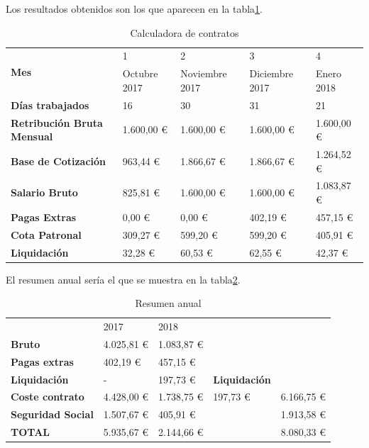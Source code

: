 Los resultados obtenidos son los que aparecen en la tabla\ref{fig:calc_cont}.


\begin{table}[htpb]
\centering
\begin{tabularx}{\textwidth}{|X|X|X|X|X|}
\hline
\multirow{2}{*}{\textbf{Mes}}      & 1            & 2              & 3              & 4          \\ \cline{2-5} 
                                   & Octubre 2017 & Noviembre 2017 & Diciembre 2017 & Enero 2018 \\ \hline
\textbf{Días trabajados}           & 16           & 30             & 31             & 21         \\ \hline
\textbf{Retribución Bruta Mensual} & 1.600,00 €   & 1.600,00 €     & 1.600,00 €     & 1.600,00 € \\ \hline
\textbf{Base de Cotización}        & 963,44 €     & 1.866,67 €     & 1.866,67 €     & 1.264,52 € \\ \hline
\textbf{Salario Bruto}             & 825,81 €     & 1.600,00 €     & 1.600,00 €     & 1.083,87 € \\ \hline
\textbf{Pagas Extras}              & 0,00 €       & 0,00 €         & 402,19 €       & 457,15 €   \\ \hline
\textbf{Cota Patronal}             & 309,27 €     & 599,20 €       & 599,20 €       & 405,91 €   \\ \hline
\textbf{Liquidación}               & 32,28 €      & 60,53 €        & 62,55 €        & 42,37 €    \\ \hline
\end{tabularx}
\caption{Calculadora de contratos}
\label{fig:calc_cont}
\end{table}


El resumen anual sería el que se muestra en la tabla\ref{fig:res_anual}.

\begin{table}[htpb]
\centering
\begin{tabular}{|l|l|l|l|l|}
\hline
\textbf{}                 & 2017       & 2018       & \multicolumn{2}{l|}{\multirow{3}{*}{}} \\ \cline{1-3}
\textbf{Bruto}            & 4.025,81 € & 1.083,87 € & \multicolumn{2}{l|}{}                  \\ \cline{1-3}
\textbf{Pagas extras}     & 402,19 €   & 457,15 €   & \multicolumn{2}{l|}{}                  \\ \hline
\textbf{Liquidación}      & -          & 197,73 €   & \textbf{Liquidación}    &              \\ \hline
\textbf{Coste contrato}   & 4.428,00 € & 1.738,75 € & 197,73 €                & 6.166,75 €   \\ \hline
\textbf{Seguridad Social} & 1.507,67 € & 405,91 €   &                         & 1.913,58 €   \\ \hline
\textbf{TOTAL}            & 5.935,67 € & 2.144,66 € &                         & 8.080,33 €   \\ \hline
\end{tabular}
\caption{Resumen anual}
\label{fig:res_anual}
\end{table}


